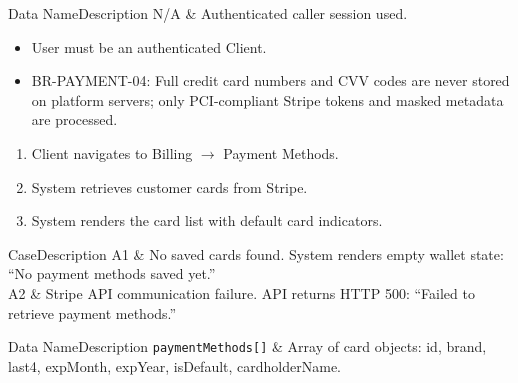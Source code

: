 
\begin{specdatatable}{Data Name}{Description}
      N/A & Authenticated caller session used.\\ \hline
\end{specdatatable}

\begin{itemize}[leftmargin=1.6em,topsep=3pt,itemsep=2pt,parsep=0pt,label=$\bullet$]
      \item User must be an authenticated Client.
\end{itemize}

\begin{itemize}[leftmargin=1.6em,topsep=3pt,itemsep=2pt,parsep=0pt,label=$\bullet$]\brrulelist
      \item BR-PAYMENT-04: Full credit card numbers and CVV codes are never stored on platform servers; only PCI-compliant Stripe tokens and masked metadata are processed.
\end{itemize}

\begin{enumerate}[leftmargin=1.8em,topsep=3pt,itemsep=2pt,parsep=0pt]
      \item Client navigates to Billing $\rightarrow$ Payment Methods.
      \item System retrieves customer cards from Stripe.
      \item System renders the card list with default card indicators.
\end{enumerate}

\begin{flowtable}{Case}{Description}
      A1 & No saved cards found. System renders empty wallet state: ``No payment methods saved yet.''\\ \hline
      A2 & Stripe API communication failure. API returns HTTP 500: ``Failed to retrieve payment methods.''\\ \hline
\end{flowtable}

\begin{specdatatable}{Data Name}{Description}
      \texttt{paymentMethods[]} & Array of card objects: id, brand, last4, expMonth, expYear, isDefault, cardholderName.\\ \hline
\end{specdatatable}

